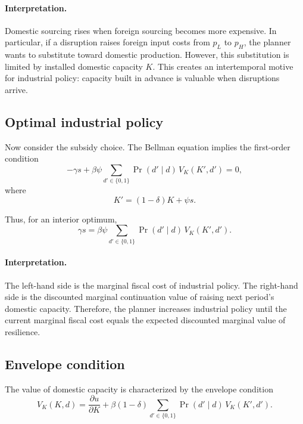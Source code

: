 \documentclass[11pt]{article}
\begin{document}
\paragraph{Interpretation.}
Domestic sourcing rises when foreign sourcing becomes more expensive. In particular, if a disruption raises foreign input costs from $p_L$ to $p_H$, the planner wants to substitute toward domestic production. However, this substitution is limited by installed domestic capacity $K$. This creates an intertemporal motive for industrial policy: capacity built in advance is valuable when disruptions arrive.

\subsection{Optimal industrial policy}

Now consider the subsidy choice. The Bellman equation implies the first-order condition
\begin{equation}
-\gamma s
+
\beta \psi
\sum_{d'\in\{0,1\}}
\Pr(d'\mid d)\,
V_K(K',d')
=0,
\end{equation}
where
\begin{equation}
K'=(1-\delta)K+\psi s.
\end{equation}

Thus, for an interior optimum,
\begin{equation}
\gamma s
=
\beta \psi
\sum_{d'\in\{0,1\}}
\Pr(d'\mid d)\,
V_K(K',d').
\end{equation}

\paragraph{Interpretation.}
The left-hand side is the marginal fiscal cost of industrial policy. The right-hand side is the discounted marginal continuation value of raising next period's domestic capacity. Therefore, the planner increases industrial policy until the current marginal fiscal cost equals the expected discounted marginal value of resilience.

\subsection{Envelope condition}

The value of domestic capacity is characterized by the envelope condition
\begin{equation}
V_K(K,d)
=
\frac{\partial u}{\partial K}
+
\beta(1-\delta)
\sum_{d'\in\{0,1\}}
\Pr(d'\mid d)\,
V_K(K',d').
\end{equation}
\end{document}
